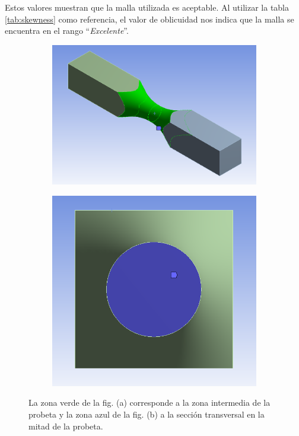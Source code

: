 Estos valores muestran que la malla utilizada es aceptable. Al utilizar la tabla \ref{tab:skewness} como referencia, el valor de oblicuidad nos indica que la malla se encuentra en el rango ``\textit{Excelente}''.

\begin{figure}[t]
\centering
	\begin{subfigure}{0.5\linewidth}
		\centering
		\includegraphics[width=0.82\linewidth]{Imagenes/zona_media.PNG}
		\caption{}\label{fig:zona_media}
	\end{subfigure}%
	\begin{subfigure}{0.5\linewidth}
		\centering
		\includegraphics[width=0.6\linewidth]{Imagenes/cara_corte.PNG}
		\caption{}\label{fig:cara_corte}
	\end{subfigure}%
\caption{La zona verde de la fig. (a) corresponde a la zona intermedia de la probeta y la zona azul de la fig. (b) a la sección transversal en la mitad de la probeta.}
\label{fig:zona_probeta}
\end{figure}


